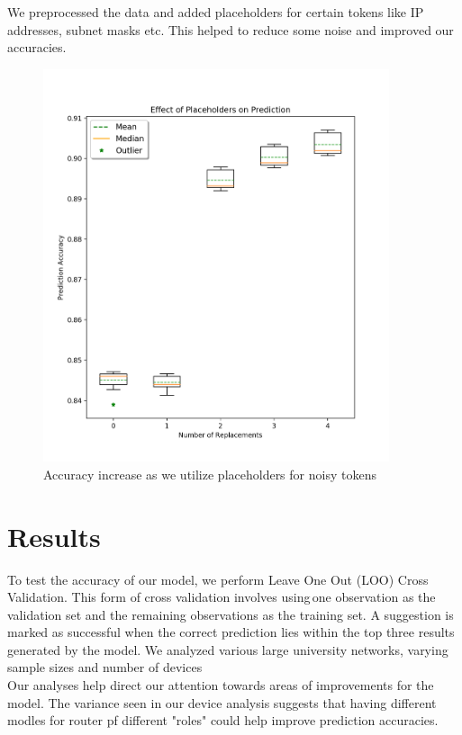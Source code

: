 We preprocessed the data and added placeholders for certain tokens like IP addresses, subnet masks etc. This helped to reduce some noise and improved our accuracies.
\begin{figure}[H]
	\centering
	\includegraphics[width=4in]{replacement_analysis.png}
	\caption{Accuracy increase as we utilize placeholders for noisy tokens}
\end{figure}

\section{Results}

To test the accuracy of our model, we perform Leave One Out (LOO) Cross Validation. This form of cross validation involves using one observation as the validation set and the remaining observations as the training set. A suggestion is marked as successful when the correct prediction lies within the top three results generated by the model. We analyzed various large university networks, varying sample sizes and number of devices\\

Our analyses help direct our attention towards areas of improvements for the model. The variance seen in our device analysis suggests that having different modles for router pf different "roles" could help improve prediction accuracies.
 

